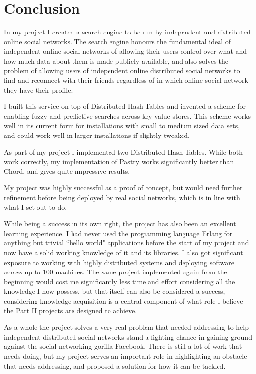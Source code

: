

\chapter{Conclusion}
In my project I created a search engine to be run by independent and distributed online social networks. The search engine honours the fundamental ideal of independent online social networks of allowing their users control over what and how much data about them is made publicly available, and also solves the problem of allowing users of independent online distributed social networks to find and reconnect with their friends regardless of in which online social network they have their profile.

I built this service on top of Distributed Hash Tables and invented a scheme for enabling fuzzy and predictive searches across key-value stores. This scheme works well in its current form for installations with small to medium sized data sets, and could work well in larger installations if slightly tweaked.

As part of my project I implemented two Distributed Hash Tables. While both work correctly, my implementation of Pastry works significantly better than Chord, and gives quite impressive results.

My project was highly successful as a proof of concept, but would need further refinement before being deployed by real social networks, which is in line with what I set out to do. 

\mbox{}

While being a success in its own right, the project has also been an excellent learning experience.
I had never used the programming language Erlang for anything but trivial ``hello world" applications before the start of my project and now have a solid working knowledge of it and its libraries. I also got significant exposure to working with highly distributed systems and deploying software across up to 100 machines.
The same project implemented again from the beginning would cost me significantly less time and effort considering all the knowledge I now possess, but that itself can also be considered a success, considering knowledge acquisition is a central component of what role I believe the Part II projects are designed to achieve.

\mbox{}

As a whole the project solves a very real problem that needed addressing to help independent distributed social networks stand a fighting chance in gaining ground against the social networking gorilla Facebook. There is still a lot of work that needs doing, but my project serves an important role in highlighting an obstacle that needs addressing, and proposed a solution for how it can be tackled.
